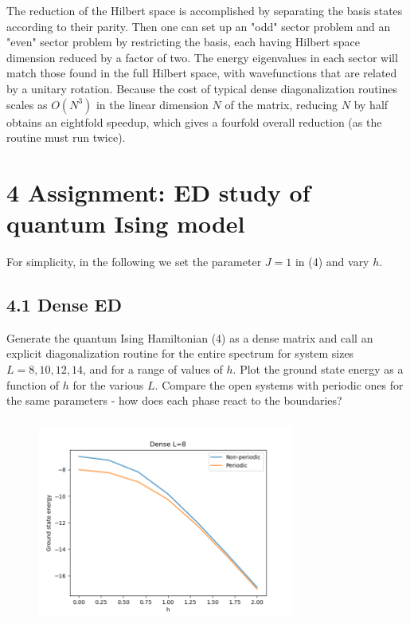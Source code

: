 \documentclass[12pt]{article}
\begin{document}
The reduction of the Hilbert space is accomplished by separating the basis states according to their parity. Then one can set up an "odd" sector problem and an "even" sector problem by restricting the basis, each having Hilbert space dimension reduced by a factor of two. The energy eigenvalues in each sector will match those found in the full Hilbert space, with wavefunctions that are related by a unitary rotation. Because the cost of typical dense diagonalization routines scales as $O\left(N^{3}\right)$ in the linear dimension $N$ of the matrix, reducing $N$ by half obtains an eightfold speedup, which gives a fourfold overall reduction (as the routine must run twice).

\section*{4 Assignment: ED study of quantum Ising model}
For simplicity, in the following we set the parameter $J=1$ in (4) and vary $h$.

\subsection*{4.1 Dense ED}
Generate the quantum Ising Hamiltonian (4) as a dense matrix and call an explicit diagonalization routine for the entire spectrum for system sizes $L=8,10,12,14$, and for a range of values of $h$. Plot the ground state energy as a function of $h$ for the various $L$. Compare the open systems with periodic ones for the same parameters - how does each phase react to the boundaries?

\subsubsection{}

\begin{figure}
\centering
\includegraphics[width=0.75\textwidth]{dense_ising_model_L8.png}
\end{figure}
\end{document}
